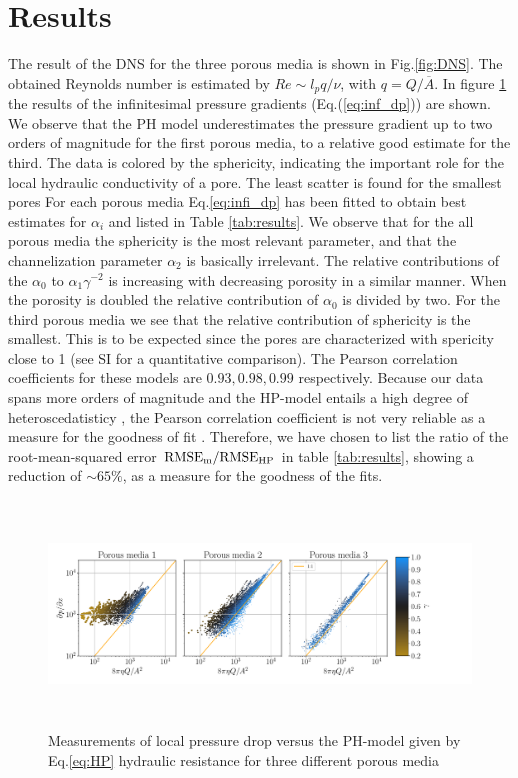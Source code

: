 \documentclass[draft]{agujournal2019}
\begin{document}
\section{Results}


The result of the DNS for the three porous media is shown in Fig.\ref{fig:DNS}. The obtained Reynolds number is estimated by $Re \sim l_p q/\nu$, with $q = Q/\overline{A}$. In figure \ref{fig:local_pressure_drop} the results of the infinitesimal pressure gradients (Eq.(\ref{eq:inf_dp})) are shown. We observe that the PH model underestimates the pressure gradient up to two orders of magnitude for the first porous media, to a relative good estimate for the third. The data is colored by the  sphericity, indicating the important role for the local hydraulic conductivity of a pore. The least scatter is found for the smallest pores For each porous media Eq.\ref{eq:infi_dp} has been fitted to obtain best estimates for $\alpha_i$ and listed in Table \ref{tab:results}. We observe that for the all porous media the sphericity is the most relevant parameter, and that the channelization parameter $\alpha_2$ is basically irrelevant.  The relative contributions of the $\alpha_0$ to $\alpha_1\gamma^{-2}$ is increasing with decreasing porosity in a similar manner. When the porosity is doubled the relative contribution of $\alpha_0$ is divided by two. For the third porous media we see that the relative contribution of sphericity is the smallest. This is to be expected since the pores are characterized with spericity close to 1 (see SI for a quantitative comparison). The Pearson correlation coefficients \citeA{}for these models are $0.93, 0.98, 0.99$ respectively. Because our data spans more orders of magnitude and the HP-model entails a high degree of heteroscedatisticy , the Pearson correlation coefficient is not very reliable as a measure for the goodness of fit . Therefore, we have chosen to list the ratio of the root-mean-squared error $\rm{RMSE}_m/\rm{RMSE}_{HP}$ in table \ref{tab:results}, showing a reduction of $\sim65\%$, as a measure for the goodness of the fits.  

\begin{figure}
\includegraphics[height=6cm]{figures/infi_dpdx_3.pdf}
\caption{Measurements of local pressure drop versus the PH-model given by Eq.\ref{eq:HP} hydraulic resistance for three different porous media}
\label{fig:local_pressure_drop}
\end{figure}
\end{document}

